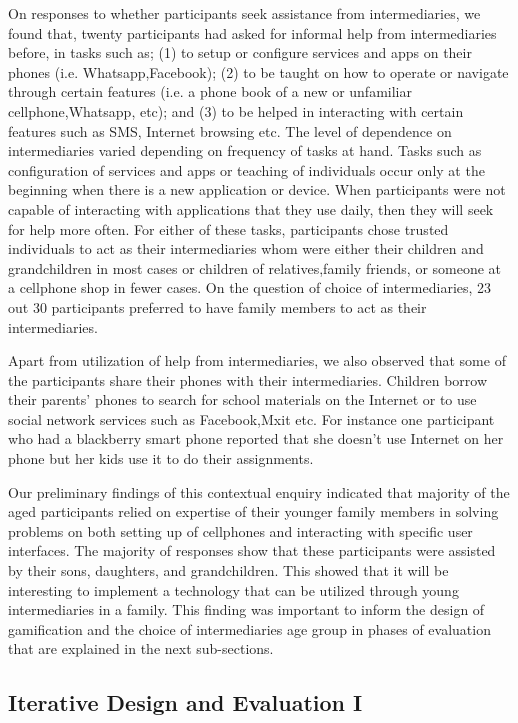 \documentclass{sig-alternate}
\begin{document}
On responses to whether participants seek assistance from intermediaries, we
found that, twenty participants had asked for informal help from
intermediaries before, in tasks such as; (1) to setup or configure services
and apps on their phones (i.e. Whatsapp,Facebook); (2) to be taught on  how to
operate or navigate through certain features (i.e. a phone book of a new or
unfamiliar cellphone,Whatsapp, etc); and (3) to be helped in interacting with
certain features such as SMS, Internet browsing etc. The level of dependence
on intermediaries varied depending on frequency of tasks at hand. Tasks such
as configuration of services and apps or teaching of individuals occur only at
the beginning when there is a new application or device. When participants
were not capable of interacting with applications that they use daily, then
they will seek for help more often. For either of these tasks, participants
chose trusted individuals to act as their intermediaries whom were either
their children and grandchildren in most cases or children of relatives,family
friends, or someone at a cellphone shop in fewer cases. On the question of
choice of intermediaries, 23 out 30 participants preferred to have family
members to act as their intermediaries.

Apart from utilization of help from intermediaries, we also observed that some
of the participants share their phones with their intermediaries. Children
borrow  their parents' phones to search for school materials on the Internet
or to use social network services such as Facebook,Mxit etc. For instance one
participant who had a blackberry smart phone reported that she doesn't use
Internet on her phone but her kids use it to do their assignments.

Our preliminary findings of this contextual enquiry indicated that majority of
the aged participants relied on expertise of their younger family members in
solving problems on both setting up of cellphones and interacting with
specific user interfaces.  The majority of responses show that these
participants were assisted by their sons, daughters, and grandchildren. This
showed that it will be interesting to implement a technology that can be
utilized through young intermediaries in a family. This finding was important
to inform the design of gamification and the choice of intermediaries age
group in phases of evaluation that are explained in the next sub-sections.

\subsection{Iterative Design and Evaluation I}
\end{document}
